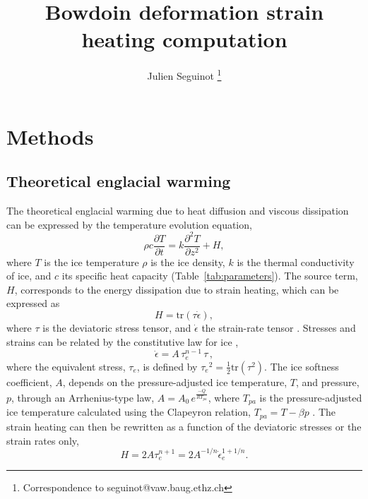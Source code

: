 \documentclass[utf8]{article}
\title{Bowdoin deformation strain heating computation}
\author[1]{Julien Seguinot
           \thanks{Correspondence to seguinot@vaw.baug.ethz.ch}}
\affil[1]{Laboratory of Hydraulics, Hydrology and Glaciology,
          ETH Zürich, Switzerland}
\begin{document}



\section{Methods}

\subsection{Theoretical englacial warming}

    The theoretical englacial warming due to heat diffusion and viscous
    dissipation can be expressed by the temperature evolution equation,
    \begin{equation}
      \rho c \frac{\partial T}{\partial t}
        = k \frac{\partial^2 T}{\partial z^2} + H,
    \end{equation}
    where $T$ is the ice temperature $\rho$ is the ice density, $k$ is the
    thermal conductivity of ice, and $c$ its specific heat capacity
    (Table~\ref{tab:parameters}). The source term, $H$, corresponds to the
    energy dissipation due to strain heating, which can be expressed as
    \begin{equation}
      H = \mathrm{tr}(\tau\dot\epsilon),
    \end{equation}
    where $\tau$ is the deviatoric stress tensor, and $\dot\epsilon$ the
    strain-rate tensor \citep[p.~417]{Clarke.etal.1977, Cuffey.Paterson.2010}.
    Stresses and strains can be related by the constitutive law for ice
    \citep{Glen.1952, Nye.1953},
    \begin{equation}
        \dot{\epsilon} = A\,\tau_e^{n-1}\,\tau \,,
    \end{equation}
    where the equivalent stress, $\tau_e$, is defined by ${\tau_e}^2 =
    \frac{1}{2} \mathrm{tr}(\tau^2)$. The ice softness coefficient, $A$,
    depends on the pressure-adjusted ice temperature, $T$, and pressure, $p$,
    through an Arrhenius-type law, $A = A_0 \,e^\frac{-Q}{RT_{pa}}$, where
    $T_{pa}$ is the pressure-adjusted ice temperature calculated using
    the Clapeyron relation, ${T_{pa} = T - \beta p}$
    \citep[p.~72]{Cuffey.Paterson.2010}.
    The strain heating can then be rewritten as a function of the deviatoric
    stresses or the strain rates only,
    \begin{equation}
        H = 2 A \tau_e^{n+1} = 2 A^{-1/n} \dot\epsilon_e^{1+1/n}.
    \end{equation}
\end{document}
